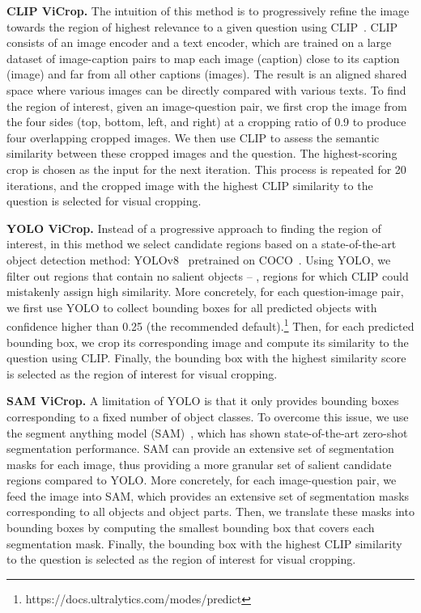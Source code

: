 \textbf{CLIP ViCrop.} The intuition of this method is to progressively refine the image towards the region of highest relevance to a given question using CLIP~\cite{clip}. CLIP consists of an image encoder and a text encoder, which are trained on a large dataset of image-caption pairs to map each image (caption) close to its caption (image) and far from all other captions (images). The result is an aligned shared space where various images can be directly compared with various texts. To find the region of interest, given an image-question pair, we first crop the image from the four sides (top, bottom, left, and right) at a cropping ratio of 0.9 to produce four overlapping cropped images. We then use CLIP to assess the semantic similarity between these cropped images and the question. The highest-scoring crop is chosen as the input for the next iteration. This process is repeated for 20 iterations, and the cropped image with the highest CLIP similarity to the question is selected for visual cropping.

\textbf{YOLO ViCrop.} Instead of a progressive approach to finding the region of interest, in this method we select candidate regions based on a state-of-the-art object detection method: YOLOv8~\citep{Jocher_YOLO_by_Ultralytics_2023} pretrained on COCO~\cite{lin2014mscoco}. Using YOLO, we filter out regions that contain no salient objects -- \ie, regions for which CLIP could mistakenly assign high similarity. More concretely, for each question-image pair, we first use YOLO to collect bounding boxes for all predicted objects with confidence higher than 0.25 (the recommended default).\footnote{https://docs.ultralytics.com/modes/predict} Then, for each predicted bounding box, we crop its corresponding image and compute its similarity to the question using CLIP. Finally, the bounding box with the highest similarity score is selected as the region of interest for visual cropping.

\textbf{SAM ViCrop.} A limitation of YOLO is that it only provides bounding boxes corresponding to a fixed number of object classes. To overcome this issue, we use the segment anything model (SAM)~\cite{kirillov2023segment}, which has shown state-of-the-art zero-shot segmentation performance. SAM can provide an extensive set of segmentation masks for each image, thus providing a more granular set of salient candidate regions compared to YOLO. More concretely, for each image-question pair, we feed the image into SAM, which provides an extensive set of segmentation masks corresponding to all objects and object parts. Then, we translate these masks into bounding boxes by computing the smallest bounding box that covers each segmentation mask. Finally, the bounding box with the highest CLIP similarity to the question is selected as the region of interest for visual cropping.

